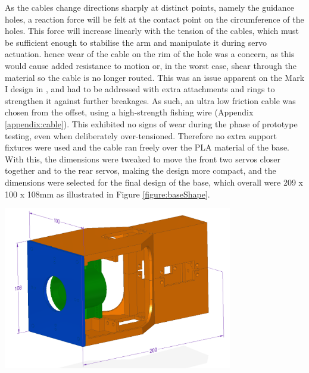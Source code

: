 \documentclass[11pt]{article}
\begin{document}
As the cables change directions sharply at distinct points, namely the guidance holes, a reaction force will be felt at the contact point on the circumference of the holes. This force will increase linearly with the tension of the cables, which must be sufficient enough to stabilise the arm and manipulate it during servo actuation. hence wear of the cable on the rim of the hole was a concern, as this would cause added resistance to motion or, in the worst case, shear through the material so the cable is no longer routed. This was an issue apparent on the Mark I design in \cite{GreggSmithDesign}, and had to be addressed with extra attachments and rings to strengthen it against further breakages. As such, an ultra low friction cable was chosen from the offset, using a high-strength fishing wire (Appendix \ref{appendix:cable}). This exhibited no signs of wear during the phase of prototype testing, even when deliberately over-tensioned. Therefore no extra support fixtures were used and the cable ran freely over the PLA material of the base. With this, the dimensions were tweaked to move the front two servos closer together and to the rear servos, making the design more compact, and the dimensions were selected for the final design of the base, which overall were 209 x 100 x 108mm as illustrated in Figure \ref{figure:baseShape}.


\begin{center}
\includegraphics[width=0.75\textwidth]{images/baseShape.png}
\label{figure:baseShape}
\end{center}
\end{document}
